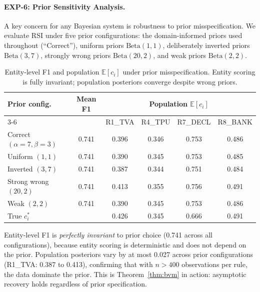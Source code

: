 \documentclass[letterpaper]{article}
\begin{document}
\paragraph{EXP-6: Prior Sensitivity Analysis.}

A key concern for any Bayesian system is robustness to prior
misspecification. We evaluate RSI under five prior configurations:
the domain-informed priors used throughout (``Correct''), uniform
priors $\mathrm{Beta}(1,1)$, deliberately inverted priors
$\mathrm{Beta}(3,7)$, strongly wrong priors $\mathrm{Beta}(20,2)$,
and weak priors $\mathrm{Beta}(2,2)$.

\begin{table}[H]
\centering
\caption{Entity-level F1 and population $\mathbb{E}[c_i]$ under prior
         misspecification. Entity scoring is fully invariant;
         population posteriors converge despite wrong priors.}
\label{tab:sensitivity}
\renewcommand{\arraystretch}{1.2}
\begin{tabular}{l c cccc}
\toprule
\textbf{Prior config.} & \textbf{Mean F1}
  & \multicolumn{4}{c}{\textbf{Population $\mathbb{E}[c_i]$}} \\
\cmidrule(lr){3-6}
& & R1\_TVA & R4\_TPU & R7\_DECL & R8\_BANK \\
\midrule
Correct $(\alpha{=}7, \beta{=}3)$ & 0.741 & 0.396 & 0.346 & 0.753 & 0.486 \\
Uniform $(1, 1)$                   & 0.741 & 0.390 & 0.345 & 0.753 & 0.485 \\
Inverted $(3, 7)$                  & 0.741 & 0.387 & 0.344 & 0.751 & 0.484 \\
Strong wrong $(20, 2)$             & 0.741 & 0.413 & 0.355 & 0.756 & 0.491 \\
Weak $(2, 2)$                      & 0.741 & 0.390 & 0.345 & 0.753 & 0.486 \\
\midrule
True $c_i^*$                       &       & 0.426 & 0.345 & 0.666 & 0.491 \\
\bottomrule
\end{tabular}
\end{table}

Entity-level F1 is \emph{perfectly invariant} to prior choice
(0.741 across all configurations), because entity scoring is
deterministic and does not depend on the prior. Population posteriors
vary by at most 0.027 across prior configurations (R1\_TVA: 0.387 to
0.413), confirming that with $n > 400$ observations per rule, the data
dominate the prior. This is Theorem~\ref{thm:bvm} in action:
asymptotic recovery holds regardless of prior specification.
\end{document}
